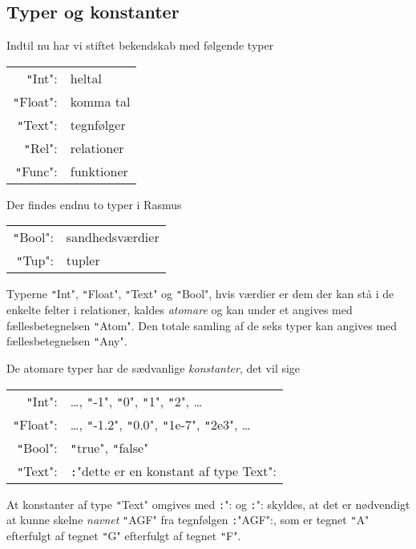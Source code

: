 \documentclass{article}
\newcounter{eks}
\begin{document}
\subsection{Typer og konstanter} 
Indtil nu har vi stiftet bekendskab med f\o{}lgende typer
\begin{center}
\begin{tabular}{rl}
\texttt"Int": & heltal \\
\texttt"Float": & komma tal \\
\texttt"Text": & tegnf\o{}lger \\
\texttt"Rel": & relationer \\
\texttt"Func": & funktioner
\end{tabular}
\end{center}
Der findes endnu to typer i {\sc Rasmus}
\begin{center}
\begin{tabular}{rl}
\texttt"Bool": & sandhedsv\ae{}rdier \\
\texttt"Tup": & tupler
\end{tabular}
\end{center}
Typerne \texttt"Int", \texttt"Float", \texttt"Text" og \texttt"Bool", 
hvis v\ae{}rdier er dem der kan st\aa{} i de
enkelte felter i relationer, kaldes {\em atomare\/} og kan under et
angives med f\ae{}llesbetegnelsen \texttt"Atom".  Den totale samling af de seks 
typer kan angives med f\ae{}llesbetegnelsen \texttt"Any".

De atomare typer har de s\ae{}dvanlige {\em konstanter}, det vil sige
\begin{center}
\begin{tabular}{rl}
\texttt"Int": & \ldots, \texttt"-1", \texttt"0", \texttt"1", \texttt"2", \ldots\\
\texttt"Float": & \ldots, \texttt"-1.2", \texttt"0.0", \texttt"1e-7", \texttt"2e3", \ldots\\
\texttt"Bool": & \texttt"true", \texttt"false"\\
\texttt"Text": & \texttt:"dette er en konstant af type Text":
\end{tabular}
\end{center}
At konstanter af type \texttt"Text" omgives med \texttt:": og \texttt:": skyldes,
at det er n\o{}dvendigt at kunne skelne {\em navnet\/} \texttt"AGF" fra
tegnf\o{}lgen \texttt:"AGF":, som er tegnet \texttt"A" efterfulgt af tegnet
\texttt"G" efterfulgt af tegnet \texttt"F".
\end{document}
